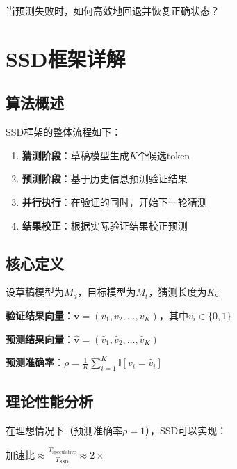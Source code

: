\documentclass[11pt,a4paper]{article}
\newcommand{\hlblue}[1]{\textcolor{primaryblue}{\textbf{#1}}}
\begin{document}
\begin{conceptbox}[问题]
  当预测失败时，如何高效地回退并恢复正确状态？
\end{conceptbox}

\newpage

\section{SSD框架详解}

\subsection{算法概述}

SSD框架的整体流程如下：

\begin{enumerate}
  \item \hlblue{猜测阶段}：草稿模型生成$K$个候选token
  \item \hlblue{预测阶段}：基于历史信息预测验证结果
  \item \hlblue{并行执行}：在验证的同时，开始下一轮猜测
  \item \hlblue{结果校正}：根据实际验证结果校正预测
\end{enumerate}

\subsection{核心定义}

\begin{infobox}[形式化定义]
  设草稿模型为$M_d$，目标模型为$M_t$，猜测长度为$K$。
  
  \textbf{验证结果向量}：$\bm{v} = (v_1, v_2, \ldots, v_K)$，其中$v_i \in \{0, 1\}$
  
  \textbf{预测结果向量}：$\hat{\bm{v}} = (\hat{v}_1, \hat{v}_2, \ldots, \hat{v}_K)$
  
  \textbf{预测准确率}：$\rho = \frac{1}{K}\sum_{i=1}^{K} \mathbb{I}[v_i = \hat{v}_i]$
\end{infobox}

\subsection{理论性能分析}

在理想情况下（预测准确率$\rho = 1$），SSD可以实现：

\begin{equationbox}
  \centering
  $\text{加速比} \approx \frac{T_{\text{speculative}}}{T_{\text{SSD}}} \approx 2\times$
\end{equationbox}
\end{document}
